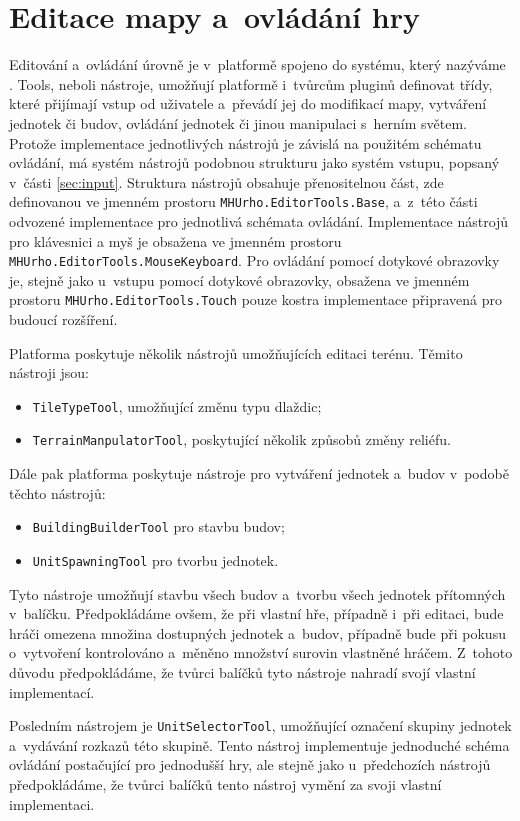 \section{Editace mapy a~ovládání hry}
\label{sec:tools}
Editování a~ovládání úrovně je v~platformě spojeno do systému, který nazýváme . Tools, neboli nástroje, umožňují platformě i~tvůrcům pluginů definovat třídy, které přijímají vstup od uživatele a~převádí jej do modifikací mapy, vytváření jednotek či budov, ovládání jednotek či jinou manipulaci s~herním světem. Protože implementace jednotlivých nástrojů je závislá na použitém schématu ovládání, má systém nástrojů podobnou strukturu jako systém vstupu, popsaný v~části \ref{sec:input}. Struktura nástrojů obsahuje přenositelnou část, zde definovanou ve jmenném prostoru \texttt{MHUrho.EditorTools.Base}, a~z~této části odvozené implementace pro jednotlivá schémata ovládání. Implementace nástrojů pro klávesnici a myš je obsažena ve jmenném prostoru \texttt{MHUrho.EditorTools.MouseKeyboard}. Pro ovládání pomocí dotykové obrazovky je, stejně jako u~vstupu pomocí dotykové obrazovky, obsažena ve jmenném prostoru \texttt{MHUrho.EditorTools.Touch} pouze kostra implementace připravená pro budoucí rozšíření.

Platforma poskytuje několik nástrojů umožňujících editaci terénu. Těmito nástroji jsou:
\begin{itemize}
	\item \texttt{TileTypeTool}, umožňující změnu typu dlaždic;
	\item \texttt{TerrainManpulatorTool}, poskytující několik způsobů změny reliéfu.
\end{itemize} 

Dále pak platforma poskytuje nástroje pro vytváření jednotek a~budov v~podobě těchto nástrojů:
\begin{itemize}
	\item \texttt{BuildingBuilderTool} pro stavbu budov;
	\item \texttt{UnitSpawningTool} pro tvorbu jednotek.
\end{itemize} 
Tyto nástroje umožňují stavbu všech budov a~tvorbu všech jednotek přítomných v~balíčku. Předpokládáme ovšem, že při vlastní hře, případně i~při editaci, bude hráči omezena množina dostupných jednotek a~budov, případně bude při pokusu o~vytvoření kontrolováno a~měněno množství surovin vlastněné hráčem. Z~tohoto důvodu předpokládáme, že tvůrci balíčků tyto nástroje nahradí svojí vlastní implementací.

Posledním nástrojem je \texttt{UnitSelectorTool}, umožňující označení skupiny jednotek a~vydávání rozkazů této skupině. Tento nástroj implementuje jednoduché schéma ovládání postačující pro jednodušší hry, ale stejně jako u~předchozích nástrojů předpokládáme, že tvůrci balíčků tento nástroj vymění za svoji vlastní implementaci.

